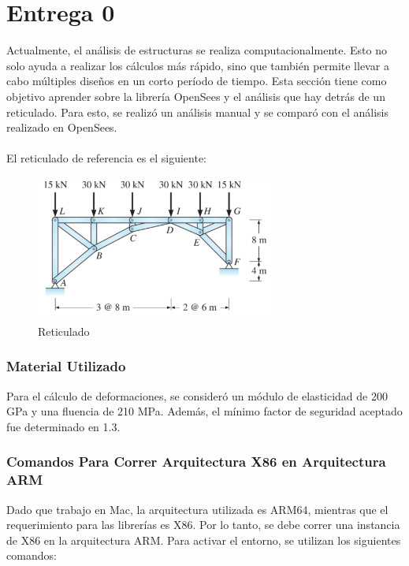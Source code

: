 \part{Entrega 0}

Actualmente, el análisis de estructuras se realiza computacionalmente. Esto no solo ayuda a realizar los cálculos más rápido, sino que también permite llevar a cabo múltiples diseños en un corto período de tiempo. Esta sección tiene como objetivo aprender sobre la librería OpenSees y el análisis que hay detrás de un reticulado. Para esto, se realizó un análisis manual y se comparó con el análisis realizado en OpenSees.
\\ \\
El reticulado de referencia es el siguiente:

\begin{figure}[H]
    \centering
    \includegraphics[width=0.7\textwidth]{FOTOS/reticulado.png}
    \caption{Reticulado}
    \label{fig:reticulado}
\end{figure}

\section{Material Utilizado}

Para el cálculo de deformaciones, se consideró un módulo de elasticidad de 200 GPa y una fluencia de 210 MPa. Además, el mínimo factor de seguridad aceptado fue determinado en 1.3.

\section{Comandos Para Correr Arquitectura X86 en Arquitectura ARM}

Dado que trabajo en Mac, la arquitectura utilizada es ARM64, mientras que el requerimiento para las librerías es X86. Por lo tanto, se debe correr una instancia de X86 en la arquitectura ARM. Para activar el entorno, se utilizan los siguientes comandos:

